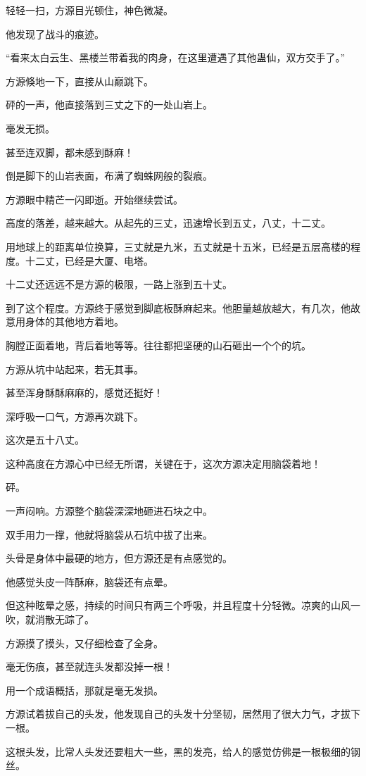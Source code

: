 \begin{this_body}
轻轻一扫，方源目光顿住，神色微凝。

他发现了战斗的痕迹。

“看来太白云生、黑楼兰带着我的肉身，在这里遭遇了其他蛊仙，双方交手了。”

方源倏地一下，直接从山巅跳下。

砰的一声，他直接落到三丈之下的一处山岩上。

毫发无损。

甚至连双脚，都未感到酥麻！

倒是脚下的山岩表面，布满了蜘蛛网般的裂痕。

方源眼中精芒一闪即逝。开始继续尝试。

高度的落差，越来越大。从起先的三丈，迅速增长到五丈，八丈，十二丈。

用地球上的距离单位换算，三丈就是九米，五丈就是十五米，已经是五层高楼的程度。十二丈，已经是大厦、电塔。

十二丈还远远不是方源的极限，一路上涨到五十丈。

到了这个程度。方源终于感觉到脚底板酥麻起来。他胆量越放越大，有几次，他故意用身体的其他地方着地。

胸膛正面着地，背后着地等等。往往都把坚硬的山石砸出一个个的坑。

方源从坑中站起来，若无其事。

甚至浑身酥酥麻麻的，感觉还挺好！

深呼吸一口气，方源再次跳下。

这次是五十八丈。

这种高度在方源心中已经无所谓，关键在于，这次方源决定用脑袋着地！

砰。

一声闷响。方源整个脑袋深深地砸进石块之中。

双手用力一撑，他就将脑袋从石坑中拔了出来。

头骨是身体中最硬的地方，但方源还是有点感觉的。

他感觉头皮一阵酥麻，脑袋还有点晕。

但这种眩晕之感，持续的时间只有两三个呼吸，并且程度十分轻微。凉爽的山风一吹，就消散无踪了。

方源摸了摸头，又仔细检查了全身。

毫无伤痕，甚至就连头发都没掉一根！

用一个成语概括，那就是毫无发损。

方源试着拔自己的头发，他发现自己的头发十分坚韧，居然用了很大力气，才拔下一根。

这根头发，比常人头发还要粗大一些，黑的发亮，给人的感觉仿佛是一根极细的钢丝。


\end{this_body}
